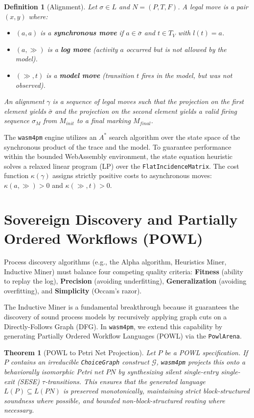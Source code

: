 \documentclass[11pt,a4paper]{article}
\newtheorem{definition}{Definition}
\newtheorem{theorem}{Theorem}
\begin{document}
\begin{definition}[Alignment]
Let $\sigma \in L$ and $N = (P, T, F)$. A legal move is a pair $(x, y)$ where:
\begin{itemize}
    \item $(a, a)$ is a \textbf{synchronous move} if $a \in \bar{\sigma}$ and $t \in T_V$ with $l(t) = a$.
    \item $(a, \gg)$ is a \textbf{log move} (activity $a$ occurred but is not allowed by the model).
    \item $(\gg, t)$ is a \textbf{model move} (transition $t$ fires in the model, but was not observed).
\end{itemize}
An alignment $\gamma$ is a sequence of legal moves such that the projection on the first element yields $\bar{\sigma}$ and the projection on the second element yields a valid firing sequence $\sigma_M$ from $M_{init}$ to a final marking $M_{final}$.
\end{definition}

The \texttt{wasm4pm} engine utilizes an $A^*$ search algorithm over the state space of the synchronous product of the trace and the model. To guarantee performance within the bounded WebAssembly environment, the state equation heuristic solves a relaxed linear program (LP) over the \texttt{FlatIncidenceMatrix}. The cost function $\kappa(\gamma)$ assigns strictly positive costs to asynchronous moves: $\kappa(a, \gg) > 0$ and $\kappa(\gg, t) > 0$.

\section{Sovereign Discovery and Partially Ordered Workflows (POWL)}

Process discovery algorithms (e.g., the Alpha algorithm, Heuristics Miner, Inductive Miner) must balance four competing quality criteria: \textbf{Fitness} (ability to replay the log), \textbf{Precision} (avoiding underfitting), \textbf{Generalization} (avoiding overfitting), and \textbf{Simplicity} (Occam's razor).

The Inductive Miner is a fundamental breakthrough because it guarantees the discovery of sound process models by recursively applying graph cuts on a Directly-Follows Graph (DFG). In \texttt{wasm4pm}, we extend this capability by generating Partially Ordered Workflow Languages (POWL) via the \texttt{PowlArena}.

\begin{theorem}[POWL to Petri Net Projection]
Let $P$ be a POWL specification. If $P$ contains an irreducible \texttt{ChoiceGraph} construct $\mathcal{G}$, \texttt{wasm4pm} projects this onto a behaviorally isomorphic Petri net $PN$ by synthesizing silent single-entry single-exit (SESE) $\tau$-transitions. This ensures that the generated language $L(P) \subseteq L(PN)$ is preserved monotonically, maintaining strict block-structured soundness where possible, and bounded non-block-structured routing where necessary.
\end{theorem}
\end{document}
